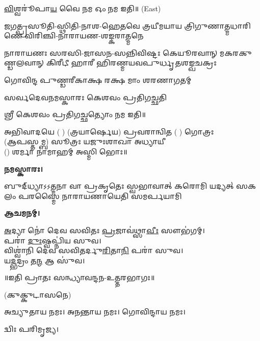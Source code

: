 \ul{𑌵𑌿}𑌶𑍍𑌵𑌰𑍂॑𑌪𑌾\ul{𑌯} 𑌵𑍈 𑌨𑌮 𑌓𑌂 𑌨𑌮 𑌇𑌤𑌿॥
{\scriptsize (East)}

{𑌜𑌗𑌤𑍍𑌪𑍍𑌰𑌸𑍂𑌤𑌿-𑌸𑍍𑌥𑌿𑌤𑌿-𑌨𑌾𑌶-𑌹𑍇𑌤𑌵𑍇}
{𑌤𑍍𑌰𑌯𑍀𑌮𑌯𑌾𑌯 𑌤𑍍𑌰𑌿𑌗𑍁𑌣𑌾𑌤𑍍𑌮𑌧𑌾𑌰𑌿𑌣𑍇}
{𑌵𑌿𑌰𑌿𑌞𑍍𑌚𑌿-𑌨𑌾𑌰𑌾𑌯𑌣-𑌶𑌙𑍍𑌕𑌰𑌾𑌤𑍍𑌮𑌨𑍇}

{𑌨𑌾𑌰𑌾𑌯𑌣𑌃 𑌸𑌰𑌸𑌿-𑌜𑌾𑌸𑌨-𑌸𑌨𑍍𑌨𑌿𑌵𑌿𑌷𑍍𑌟𑌃}
{𑌕𑍇𑌯𑍂𑌰𑌵𑌾𑌨𑍍 𑌮𑌕𑌰𑌕𑍁𑌣𑍍𑌡𑌲𑌵𑌾𑌨𑍍 𑌕𑌿𑌰𑍀𑌟𑍀}
{𑌹𑌾𑌰𑍀 𑌹𑌿𑌰𑌣𑍍𑌮𑌯𑌵𑌪𑍁𑌰𑍍𑌧𑍃𑌤𑌶𑌙𑍍𑌖𑌚𑌕𑍍𑌰𑌃}

{𑌗𑍋𑌵𑌿𑌨𑍍𑌦 𑌪𑍁𑌣𑍍𑌡𑌰𑍀𑌕𑌾𑌕𑍍𑌷 𑌰𑌕𑍍𑌷 𑌮𑌾𑌂 𑌶𑌰𑌣𑌾𑌗𑌤𑌮𑍍}

{𑌸𑌰𑍍𑌵𑌦𑍇𑌵𑌨𑌮𑌸𑍍𑌕𑌾𑌰𑌃 𑌕𑍇𑌶𑌵𑌂 𑌪𑍍𑌰𑌤𑌿𑌗𑌚𑍍𑌛𑌤𑌿}

𑌶𑍍𑌰𑍀 𑌕𑍇𑌶𑌵𑌂 𑌪𑍍𑌰𑌤𑌿𑌗𑌚𑍍𑌛𑌤𑍍𑌯𑍋𑌂 𑌨𑌮 𑌇𑌤𑌿॥

𑌅𑌭𑌿𑌵𑌾𑌦𑌯𑍇 ( ) (𑌤𑍍𑌰𑌯𑌾𑌰𑍍𑌷𑍇𑌯) 𑌪𑍍𑌰𑌵𑌰𑌾𑌨𑍍𑌵𑌿𑌤 ( ) 𑌗𑍋𑌤𑍍𑌰𑌃\\
(𑌆𑌪𑌸𑍍𑌤𑌮𑍍𑌬) 𑌸𑍂𑌤𑍍𑌰𑌃 𑌯𑌜𑍁𑌃𑌶𑌾𑌖𑌾 𑌅𑌧𑍍𑌯𑌾𑌯𑍀\\
() 𑌶𑌰𑍍𑌮𑌾 𑌨𑌾𑌮𑌾𑌹𑌮𑍍 𑌅𑌸𑍍𑌮𑌿 𑌭𑍋𑌃॥

\textbf{𑌨𑌮𑌸𑍍𑌕𑌾𑌰𑌃।}

{𑌬𑍁𑌦𑍍‌𑌧𑍍𑌯𑌾𑌽𑌽𑌤𑍍𑌮𑌨𑌾 𑌵𑌾 𑌪𑍍𑌰𑌕𑍃𑌤𑍇𑌃 𑌸𑍍𑌵𑌭𑌾𑌵𑌾𑌤𑍍}
{𑌕𑌰𑍋𑌮𑌿 𑌯𑌦𑍍𑌯𑌤𑍍 𑌸𑌕𑌲𑌂 𑌪𑌰𑌸𑍍𑌮𑍈}
{𑌨𑌾𑌰𑌾𑌯𑌣𑌾𑌯𑍇𑌤𑌿 𑌸𑌮𑌰𑍍𑌪𑌯𑌾𑌮𑌿}

\textbf{𑌆𑌚𑌮𑌨𑌮𑍍।}


\ul{𑌅}𑌦𑍍𑌯𑌾 𑌨𑍋॑ 𑌦𑍇𑌵 𑌸𑌵𑌿𑌤𑌃 \ul{𑌪𑍍𑌰}𑌜𑌾𑌵॑𑌥𑍍𑌸𑌾\ul{𑌵𑍀𑌃} 𑌸𑍗𑌭॑𑌗𑌮𑍍।\\
𑌪𑌰𑌾॑ \ul{𑌦𑍁𑌃}𑌷𑍍𑌵𑌪𑍍𑌨𑌿॑𑌯 𑌸𑍁𑌵।\\
𑌵𑌿𑌶𑍍𑌵𑌾॑𑌨𑌿 𑌦𑍇𑌵 𑌸𑌵𑌿𑌤𑌰𑍍𑌦𑍁\ul{𑌰𑌿}𑌤𑌾\ul{𑌨𑌿} 𑌪𑌰𑌾॑ 𑌸𑍁𑌵।\\
𑌯\ul{𑌦𑍍𑌭}𑌦𑍍𑌰𑌂 𑌤\ul{𑌨𑍍𑌮} 𑌆 𑌸𑍁॑𑌵।

\centerline{॥𑌇𑌤𑌿 𑌪𑍍𑌰𑌾𑌤𑌃 𑌸𑌨𑍍𑌧𑍍𑌯𑌾𑌵𑌨𑍍𑌦𑌨-𑌉𑌤𑍍𑌤𑌰𑌭𑌾𑌗𑌃॥}


\renewcommand{\sectionmark}[1]{%
\markboth{\large #1 (𑌮𑌾𑌧𑍍𑌯𑌾𑌹𑍍𑌨𑌿𑌕𑌮𑍍)}{}}


(𑌕𑍁𑌕𑍍𑌕𑍁𑌟𑌾𑌸𑌨𑍇)

𑌅𑌚𑍍𑌯𑍁𑌤𑌾𑌯 𑌨𑌮𑌃। 𑌅𑌨𑌨𑍍𑌤𑌾𑌯 𑌨𑌮𑌃। 𑌗𑍋𑌵𑌿𑌨𑍍𑌦𑌾𑌯 𑌨𑌮𑌃। 

𑌦𑍍𑌵𑌿𑌃 𑌪𑌰𑌿𑌮𑍃𑌜𑍍𑌯।


